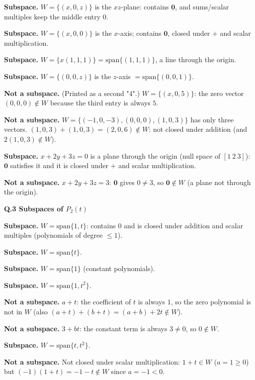 \begin{description}[leftmargin=1.2cm,itemsep=2pt]
\item[1.] \textbf{Subspace.} $W=\{(x,0,z)\}$ is the $xz$-plane: contains $\mathbf0$, and sums/scalar multiples keep the middle entry $0$.
\item[2.] \textbf{Subspace.} $W=\{(x,0,0)\}$ is the $x$-axis; contains $\mathbf 0$, closed under $+$ and scalar multiplication.
\item[3.] \textbf{Subspace.} $W=\{x(1,1,1)\}=\mathrm{span}\{(1,1,1)\}$, a line through the origin.
\item[4.] \textbf{Subspace.} $W=\{(0,0,z)\}$ is the $z$-axis $=\mathrm{span}\{(0,0,1)\}$.
\item[5.] \textbf{Not a subspace.} (Printed as a second "4".) $W=\{(x,0,5)\}$: the zero vector $(0,0,0)\notin W$ because the third entry is always $5$.
\item[6.] \textbf{Not a subspace.} $W=\{(-1,0,-3),(0,0,0),(1,0,3)\}$ has only three vectors. $(1,0,3)+(1,0,3)=(2,0,6)\notin W$: not closed under addition (and $2(1,0,3)\notin W$).
\item[7.] \textbf{Subspace.} $x+2y+3z=0$ is a plane through the origin (null space of $[1\ 2\ 3]$): $\mathbf0$ satisfies it and it is closed under $+$ and scalar multiplication.
\item[8.] \textbf{Not a subspace.} $x+2y+3z=3$: $\mathbf 0$ gives $0\ne3$, so $\mathbf0\notin W$ (a plane not through the origin).
\end{description}
\medskip\noindent\textbf{Q.3  Subspaces of $P_2(t)$}\par\smallskip
\begin{description}[leftmargin=1.2cm,itemsep=2pt]
\item[1.] \textbf{Subspace.} $W=\mathrm{span}\{1,t\}$: contains $0$ and is closed under addition and scalar multiples (polynomials of degree $\le1$).
\item[2.] \textbf{Subspace.} $W=\mathrm{span}\{t\}$.
\item[3.] \textbf{Subspace.} $W=\mathrm{span}\{1\}$ (constant polynomials).
\item[4.] \textbf{Subspace.} $W=\mathrm{span}\{1,t^2\}$.
\item[5.] \textbf{Not a subspace.} $a+t$: the coefficient of $t$ is always $1$, so the zero polynomial is not in $W$ (also $(a+t)+(b+t)=(a+b)+2t\notin W$).
\item[6.] \textbf{Not a subspace.} $3+bt$: the constant term is always $3\neq 0$, so $0\notin W$.
\item[7.] \textbf{Subspace.} $W=\mathrm{span}\{t,t^2\}$.
\item[8.] \textbf{Not a subspace.} Not closed under scalar multiplication: $1+t\in W$ ($a=1\ge0$) but $(-1)(1+t)=-1-t\notin W$ since $a=-1<0$.
\end{description}
